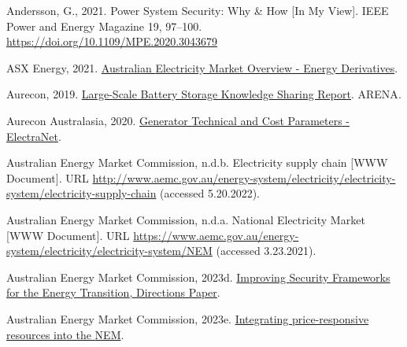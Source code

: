 \documentclass[12pt,a4paper,]{report}
\newlength{\cslhangindent}
\newenvironment{CSLReferences}[2] %
 {%
  \setlength{\parindent}{0pt}
  \ifodd #1 \everypar{\setlength{\hangindent}{\cslhangindent}}\ignorespaces\fi
  \ifnum #2 > 0
  \setlength{\parskip}{#2\baselineskip}
  \fi
 }%
 {}
\begin{document}
\begin{CSLReferences}{1}{0}
\leavevmode{}%
Andersson, G., 2021. Power {System Security}: {Why} \& {How} {[}{In My
View}{]}. IEEE Power and Energy Magazine 19, 97--100.
\url{https://doi.org/10.1109/MPE.2020.3043679}

\leavevmode{}%
ASX Energy, 2021.
\href{https://www.asxenergy.com.au/products/electricity_futures}{Australian
{Electricity Market Overview} - {Energy Derivatives}}.

\leavevmode{}%
Aurecon, 2019.
\href{https://arena.gov.au/knowledge-bank/large-scale-battery-storage-knowledge-sharing-report/}{Large-{Scale
Battery Storage Knowledge Sharing Report}}. {ARENA}.

\leavevmode{}%
Aurecon Australasia, 2020.
\href{https://www.electranet.com.au/wp-content/uploads/projects/2016/11/508986-REP-ElectraNet-Generator-Technical-And-Cost-Parameters-23July2020.pdf}{Generator
{Technical} and {Cost Parameters} - {ElectraNet}}.

\leavevmode{}%
Australian Energy Market Commission, n.d.b. Electricity supply chain
{[}WWW Document{]}. URL
\url{http://www.aemc.gov.au/energy-system/electricity/electricity-system/electricity-supply-chain}
(accessed 5.20.2022).

\leavevmode{}%
Australian Energy Market Commission, n.d.a. National {Electricity
Market} {[}WWW Document{]}. URL
\url{https://www.aemc.gov.au/energy-system/electricity/electricity-system/NEM}
(accessed 3.23.2021).

\leavevmode{}%
Australian Energy Market Commission, 2023d.
\href{https://www.aemc.gov.au/sites/default/files/2023-08/ERC0290\%20\%E2\%80\%93\%20Improving\%20security\%20frameworks\%20for\%20the\%20energy\%20transition.pdf}{Improving
{Security Frameworks} for the {Energy Transition}, {Directions Paper}}.

\leavevmode{}%
Australian Energy Market Commission, 2023e.
\href{https://www.aemc.gov.au/sites/default/files/2023-08/ERC0352\%20-\%20Integrating\%20price-responsive\%20resources\%20into\%20the\%20NEM\%20-\%20Consultation\%20paper.pdf}{Integrating
price-responsive resources into the {NEM}}.


\end{CSLReferences}
\end{document}
